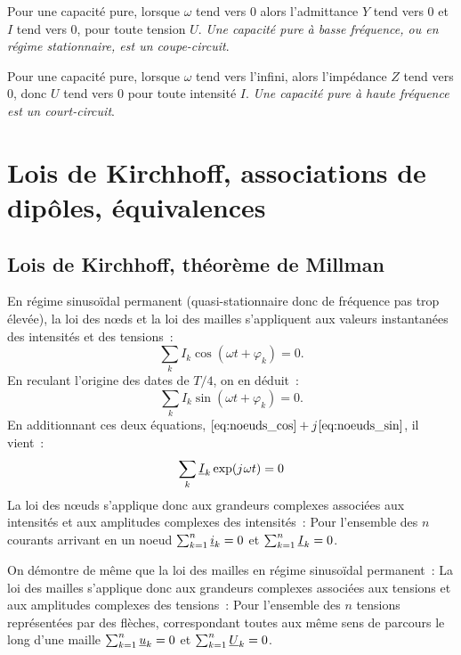         Pour une capacité pure, lorsque $\omega$ tend vers 0 alors l'admittance $Y$ tend vers 0 et $I$ tend vers 0, pour toute tension $U$. \emph{Une capacité pure à basse fréquence, ou en régime stationnaire, est un coupe-circuit}.

        Pour une capacité pure, lorsque $\omega$ tend vers l'infini, alors l'impédance $Z$ tend vers 0, donc $U$ tend vers 0 pour toute intensité $I$. \emph{Une capacité pure à haute fréquence est un court-circuit}.
\section{Lois de Kirchhoff, associations de dipôles, équivalences}
    \subsection{Lois de Kirchhoff, théorème de Millman}
        En régime sinusoïdal permanent (quasi-stationnaire donc de fréquence pas trop élevée), la loi des n\oe{}ds et la loi des mailles s'appliquent aux valeurs instantanées des intensités et des tensions~:
        \begin{equation}
            \label{eq:noeuds_cos}
            \sum_{k} I_k\cos(\omega t +\varphi_k) = 0.
        \end{equation}
        En reculant l'origine des dates de $T/4$, on en déduit~:
        \begin{equation}
            \label{eq:noeuds_sin}
            \sum_{k} I_k\sin(\omega t +\varphi_k) = 0.
        \end{equation}
        En additionnant ces deux équations, $\eqref{eq:noeuds_cos} + {j\mkern1mu} \eqref{eq:noeuds_sin}$, il vient~:
        \begin{equation}
            \label{eq:noeuds_cplx}
            \sum_k \underline{I}_k \exp({j\mkern1mu}\omega t) = 0
        \end{equation}
        La loi des nœuds s'applique donc aux grandeurs complexes associées aux intensités et aux amplitudes complexes des intensités~: Pour l'ensemble des $n$ courants arrivant en un noeud $\sum_{k=1}^n \underline{i}_k = 0$ et $\sum_{k=1}^n \underline{I}_k = 0$.

        On démontre de même que la loi des mailles en régime sinusoïdal permanent~: La loi des mailles s'applique donc aux grandeurs complexes associées aux tensions et aux amplitudes complexes des tensions~: Pour l'ensemble des $n$ tensions représentées par des flèches, correspondant toutes aux même sens de parcours le long d'une maille $\sum_{k=1}^n \underline{u}_k = 0$ et $\sum_{k=1}^n \underline{U}_k = 0$.

